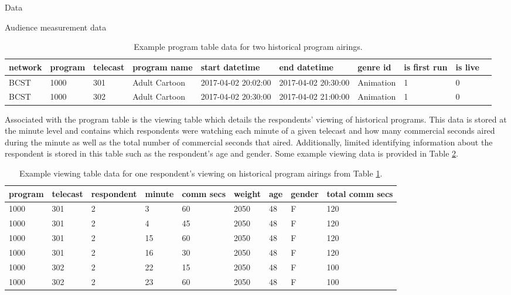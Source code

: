 \begin{chapter}{Data}
\begin{section}{Audience measurement data}
  \begin{table}[h!]
    \centering
    \begin{adjustbox}{width=1.1\textwidth,center=\textwidth}
      \large
      \begin{tabular}{llllllllll}
        network & program & telecast & program name & start datetime & end datetime & genre id & is first run & is live\\
        \hline
        BCST & 1000 & 301 & Adult Cartoon & 2017-04-02 20:02:00 & 2017-04-02 20:30:00 & Animation & 1 & 0 \\
        BCST & 1000 & 302 & Adult Cartoon & 2017-04-02 20:30:00 & 2017-04-02 21:00:00 & Animation & 1 & 0
      \end{tabular}
    \end{adjustbox}
    \caption{Example program table data for two historical program airings.}\label{tab:amprogram}
  \end{table}

  Associated with the program table is the viewing table which details the respondents' viewing of
  historical programs. This data is stored at the minute level and contains
  which respondents were watching each minute of a given telecast and how many commercial seconds aired
  during the minute as well as the total number of commercial seconds that aired.
  Additionally, limited identifying information about the
  respondent is stored in this table such as the respondent's age and gender.
  Some example viewing data is provided in Table \ref{tab:amviewing}.

  \begin{table}[h!]
    \centering
    \begin{adjustbox}{width=1.1\textwidth,center=\textwidth}
      \large
    \begin{tabular}{lllllllll}
      program & telecast & respondent & minute & comm secs & weight & age & gender & total comm secs\\
      \hline
      1000 & 301 & 2 & 3 & 60 & 2050 & 48 & F & 120\\
      1000 & 301 & 2 & 4 & 45 & 2050 & 48 & F & 120\\
      1000 & 301 & 2 & 15 & 60 & 2050 & 48 & F & 120\\
      1000 & 301 & 2 & 16 & 30 & 2050 & 48 & F & 120\\
      1000 & 302 & 2 & 22 & 15 & 2050 & 48 & F & 100\\
      1000 & 302 & 2 & 23 & 60 & 2050 & 48 & F & 100
    \end{tabular}
    \end{adjustbox}
    \caption{Example viewing table data for one respondent's viewing on historical program airings from Table \ref{tab:amprogram}.}\label{tab:amviewing}
  \end{table}


\end{section}
\end{chapter}
